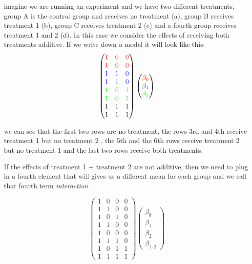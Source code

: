 \documentclass[
  letterpaper,
  DIV=11,
  numbers=noendperiod]{scrartcl}
\begin{document}
imagine we are running an experiment and we have two different
treatments, group A is the control group and receives no treatment (a),
group B receives treatment 1 (b), group C receives treatment 2 (c) and a
fourth group receives treatment 1 and 2 (d). In this case we consider
the effects of receiving both treatments additive. If we write down a
model it will look like this: \[
\begin{pmatrix}
\color{red}1 & \color{red}0 & \color{red}0 \\
\color{red}1 & \color{red}0 & \color{red}0 \\
\color{blue}1 & \color{blue}1 & \color{blue}0 \\
\color{blue}1 & \color{blue}1 & \color{blue}0 \\
\color{green}1 & \color{green}0 & \color{green}1 \\
\color{green}1 & \color{green}0 & \color{green}1 \\
1 & 1 & 1 \\
1 & 1 & 1
\end{pmatrix}
\begin{pmatrix}
\color{red}{\beta_0 }\\
\color{blue}{\beta_1 }\\
\color{green}{\beta_2}
\end{pmatrix}
\]

we can see that the first two rows are no treatment, the rows 3rd and
4th receive treatment 1 but no treatment 2 , the 5th and the 6th rows
receive treatment 2 but no treatment 1 and the last two rows receive
both treatments.

If the effects of treatment 1 + treatment 2 are not additive, then we
need to plug in a fourth element that will gives us a different mean for
each group and we call that fourth term \emph{interaction}

\[
\begin{pmatrix}
1 & 0 & 0 & 0\\
1 & 1 & 0 & 0\\
1 & 0 & 1 & 0\\
1 & 1 & 0 & 0\\
1 & 0 & 0 & 0\\
1 & 1 & 1 & 0\\
1 & 0 & 1 & 1\\
1 & 1 & 1 & 1
\end{pmatrix}
\begin{pmatrix}
\beta_0 \\
\beta_1 \\
\beta_2\\
\beta_{1:2}
\end{pmatrix}
\]
\end{document}
